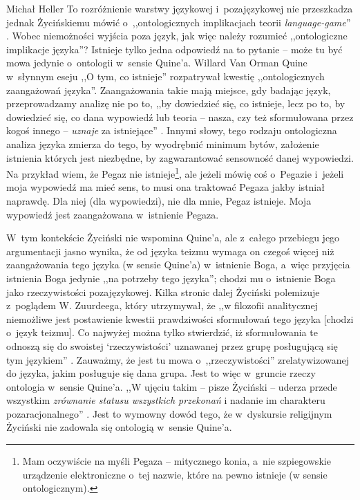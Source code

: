 \begin{artplenv}{Michał Heller}
To rozróżnienie warstwy językowej i~pozajęzykowej nie przeszkadza jednak Życińskiemu mówić o~,,ontologicznych implikacjach teorii \textit{language-game}''
\parencite[][s.~18]{zycinski_teizm_1985}. %
 Wobec niemożności wyjścia poza język, jak więc należy rozumieć ,,ontologiczne implikacje języka''? Istnieje tylko jedna odpowiedź na to pytanie -- może tu być mowa jedynie o~ontologii w~sensie Quine'a. Willard Van Orman Quine w~słynnym eseju ,,O tym, co istnieje'' 
\parencite[][]{quine_o_1969} %
 rozpatrywał kwestię ,,ontologicznych zaangażowań języka''. Zaangażowania takie mają miejsce, gdy badając język, przeprowadzamy analizę nie po to, ,,by dowiedzieć się, co istnieje, lecz po to, by dowiedzieć się, co dana wypowiedź lub teoria -- nasza, czy też sformułowana przez kogoś innego -- \textit{uznaje} za istniejące''
\parencite[][s.~29]{quine_o_1969}. %
 Innymi słowy, tego rodzaju ontologiczna analiza języka zmierza do tego, by wyodrębnić minimum bytów, założenie istnienia których jest niezbędne, by zagwarantować sensowność danej wypowiedzi. Na przykład wiem, że Pegaz nie istnieje\footnote{ Mam oczywiście na myśli Pegaza -- mitycznego konia, a~nie szpiegowskie urządzenie elektroniczne o~tej nazwie, które na pewno istnieje (w sensie ontologicznym).}, ale jeżeli mówię coś o~Pegazie i~jeżeli moja wypowiedź ma mieć sens, to musi ona traktować Pegaza jakby istniał naprawdę. Dla niej (dla wypowiedzi), nie dla mnie, Pegaz istnieje. Moja wypowiedź jest zaangażowana w~istnienie Pegaza.

W~tym kontekście Życiński nie wspomina Quine'a, ale z~całego przebiegu jego argumentacji jasno wynika, że od języka teizmu wymaga on czegoś więcej niż zaangażowania tego języka (w sensie Quine'a) w~istnienie Boga, a~więc przyjęcia istnienia Boga jedynie ,,na potrzeby tego języka''; chodzi mu o~istnienie Boga jako rzeczywistości pozajęzykowej. Kilka stronic dalej Życiński polemizuje z~poglądem W. Zuurdeega, który utrzymywał, że ,,w filozofii analitycznej niemożliwe jest postawienie kwestii prawdziwości sformułowań tego języka [chodzi o~język teizmu]. Co najwyżej można tylko stwierdzić, iż sformułowania te odnoszą się do swoistej ‘rzeczywistości' uznawanej przez grupę posługującą się tym językiem''
\parencite[][s.~28]{zycinski_teizm_1985}. %
 Zauważmy, że jest tu mowa o~,,rzeczywistości'' zrelatywizowanej do języka, jakim posługuje się dana grupa. Jest to więc w~gruncie rzeczy ontologia w~sensie Quine'a. ,,W ujęciu takim -- pisze Życiński -- uderza przede wszystkim \textit{zrównanie statusu wszystkich przekonań} i nadanie im charakteru pozaracjonalnego'' 
\parencite[][s.~28]{zycinski_teizm_1985}. %
 Jest to wymowny dowód tego, że w~dyskursie religijnym Życiński nie zadowala się ontologią w~sensie Quine'a.


\end{artplenv}
